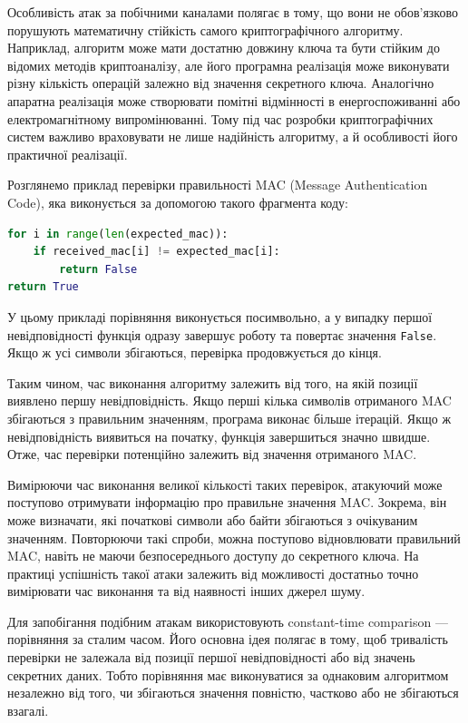 Особливість атак за побічними каналами полягає в тому, що вони не обов'язково порушують математичну стійкість самого криптографічного алгоритму. 
Наприклад, алгоритм може мати достатню довжину ключа та бути стійким до відомих методів криптоаналізу, але його програмна реалізація може виконувати 
різну кількість операцій залежно від значення секретного ключа. Аналогічно апаратна реалізація може створювати помітні відмінності в енергоспоживанні 
або електромагнітному випромінюванні. Тому під час розробки криптографічних систем важливо враховувати не лише надійність алгоритму, а й особливості його практичної реалізації.

Розглянемо приклад перевірки правильності MAC (Message Authentication Code), яка виконується за допомогою такого фрагмента коду:

\begin{lstlisting}[language=Python]
for i in range(len(expected_mac)):
    if received_mac[i] != expected_mac[i]:
        return False
return True
\end{lstlisting}

У цьому прикладі порівняння виконується посимвольно, а у випадку першої невідповідності функція одразу завершує роботу та повертає значення \texttt{False}. 
Якщо ж усі символи збігаються, перевірка продовжується до кінця.

Таким чином, час виконання алгоритму залежить від того, на якій позиції виявлено першу невідповідність. Якщо перші кілька символів отриманого MAC збігаються 
з правильним значенням, програма виконає більше ітерацій. Якщо ж невідповідність виявиться на початку, функція завершиться значно швидше. 
Отже, час перевірки потенційно залежить від значення отриманого MAC.

Вимірюючи час виконання великої кількості таких перевірок, атакуючий може поступово отримувати інформацію про правильне значення MAC. 
Зокрема, він може визначати, які початкові символи або байти збігаються з очікуваним значенням. Повторюючи такі спроби, 
можна поступово відновлювати правильний MAC, навіть не маючи безпосереднього доступу до секретного ключа. 
На практиці успішність такої атаки залежить від можливості достатньо точно вимірювати час виконання та від наявності інших джерел шуму.

Для запобігання подібним атакам використовують constant-time comparison — порівняння за сталим часом. Його основна ідея полягає в тому, 
щоб тривалість перевірки не залежала від позиції першої невідповідності або від значень секретних даних. Тобто порівняння має виконуватися 
за однаковим алгоритмом незалежно від того, чи збігаються значення повністю, частково або не збігаються взагалі.

